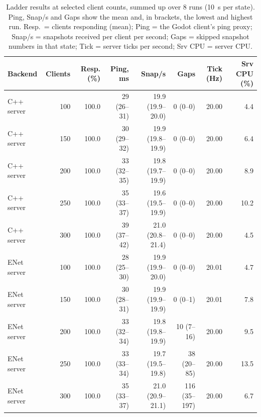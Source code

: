 \begin{table}[H]
\centering
\small
\setlength{\tabcolsep}{3pt}
\begin{tabular}{@{}lrrrrrrr@{}}
\toprule
Backend & Clients & Resp. (\%) & Ping, ms & Snap/s & Gaps & Tick (Hz) & Srv CPU (\%) \\
\midrule
C++ server & 100 & 100.0 & 29 (26--31) & 19.9 (19.9--20.0) & 0 (0--0) & 20.00 & 4.4 \\
C++ server & 150 & 100.0 & 30 (29--32) & 19.9 (19.8--19.9) & 0 (0--0) & 20.00 & 6.4 \\
C++ server & 200 & 100.0 & 33 (32--35) & 19.8 (19.7--19.9) & 0 (0--0) & 20.00 & 8.9 \\
C++ server & 250 & 100.0 & 35 (33--37) & 19.6 (19.5--19.9) & 0 (0--0) & 20.00 & 10.2 \\
C++ server & 300 & 100.0 & 39 (37--42) & 21.0 (20.8--21.4) & 0 (0--0) & 20.00 & 4.5 \\
\midrule
ENet server & 100 & 100.0 & 28 (25--30) & 19.9 (19.9--20.0) & 0 (0--0) & 20.01 & 4.7 \\
ENet server & 150 & 100.0 & 30 (28--31) & 19.9 (19.9--19.9) & 0 (0--1) & 20.01 & 7.8 \\
ENet server & 200 & 100.0 & 33 (32--34) & 19.8 (19.8--19.9) & 10 (7--16) & 20.00 & 9.5 \\
ENet server & 250 & 100.0 & 33 (33--34) & 19.7 (19.5--19.8) & 38 (20--85) & 20.00 & 13.5 \\
ENet server & 300 & 100.0 & 35 (33--37) & 21.0 (20.9--21.1) & 116 (35--197) & 20.00 & 6.7 \\
\bottomrule
\end{tabular}
\caption{Ladder results at selected client counts, summed up over 8 runs (10~s per state). Ping, Snap/s and Gaps show the mean and, in brackets, the lowest and highest run. Resp.\ = clients responding (mean); Ping = the Godot client's ping proxy; Snap/s = snapshots received per client per second; Gaps = skipped snapshot numbers in that state; Tick = server ticks per second; Srv CPU = server CPU.}
\label{tab:ladder}
\end{table}

